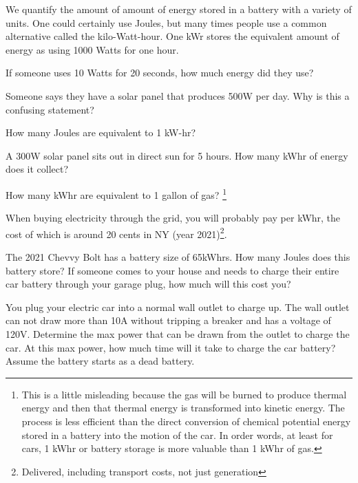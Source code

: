 We quantify the amount of amount of energy stored in a battery with a variety of units. One could certainly use Joules, but many times people use a common alternative called the kilo-Watt-hour. One kWr stores the equivalent amount of energy as using 1000 Watts for one hour.

\begin{alevel}
If someone uses 10 Watts for 20 seconds, how much energy did they use?
\end{alevel}

\begin{blevel}
Someone says they have a solar panel that produces 500W per day. Why is this a confusing statement?
\end{blevel}

\begin{blevel}
How many Joules are equivalent to 1 kW-hr?
\end{blevel}

\begin{blevel}
A 300W solar panel sits out in direct sun for 5 hours. How many kWhr of energy does it collect?
\end{blevel}

\begin{blevel}
How many kWhr are equivalent to 1 gallon of gas? \footnote{This is a little misleading because the gas will be burned to produce thermal energy and then that thermal energy is transformed into kinetic energy. The process is less efficient than the direct conversion of chemical potential energy stored in a battery into the motion of the car. In order words, at least for cars, 1 kWhr or battery storage is more valuable than 1 kWhr of gas.}
\end{blevel}

When buying electricity through the grid, you will probably pay per kWhr, the cost of which is around 20 cents in NY (year 2021)\footnote{Delivered, including transport costs, not just generation}.

\begin{blevel}
The 2021 Chevvy Bolt has a battery size of 65kWhrs. How many Joules does this battery store? If someone comes to your house and needs to charge their entire car battery through your garage plug, how much will this cost you? 
\end{blevel}

\begin{blevel}
You plug your electric car into a normal wall outlet to charge up. The wall outlet can not draw more than 10A without tripping a breaker and has a voltage of 120V. Determine the max power that can be drawn from the outlet to charge the car. At this max power, how much time will it take to charge the car battery? Assume the battery starts as a dead battery. 
\end{blevel}


